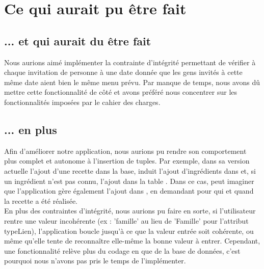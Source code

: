 \documentclass[a4paper,10pt]{report}
\begin{document}
\chapter{Ce qui aurait pu être fait}
\section{... et qui aurait du être fait}
Nous aurions aimé implémenter la contrainte d'intégrité permettant de vérifier à chaque invitation de personne à une date donnée que les gens invités à cette même date aient bien le même menu prévu. Par manque de temps, nous avons dû mettre cette fonctionnalité de côté et avons préféré nous concentrer sur les fonctionnalités imposées par le cahier des charges.
\section{... en plus}

Afin d'améliorer notre application, nous aurions pu rendre son comportement plus complet et autonome à l'insertion de tuples. Par exemple, dans sa version actuelle l'ajout d'une recette dans la base, induit l'ajout d'ingrédients dans  et, si un ingrédient n'est pas connu, l'ajout dans la table . Dans ce cas, peut imaginer que l'application gère également l'ajout dans , en demandant pour qui et quand la recette a été réalisée.\\

En plus des contraintes d'intégrité, nous aurions pu faire en sorte, si l'utilisateur rentre une valeur incohérente (ex : 'famille' au lieu de 'Famille' pour l'attribut typeLien), l'application boucle jusqu'à ce que la valeur entrée soit cohérente, ou même qu'elle tente de reconnaître elle-même la bonne valeur à entrer. Cependant, une fonctionnalité relève plus du codage en  que de la base de données, c'est pourquoi nous n'avons pas pris le temps de l'implémenter.\\
\end{document}
